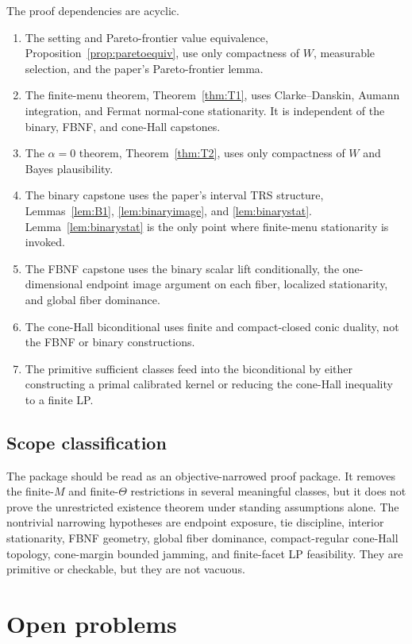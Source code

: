 \documentclass[11pt]{article}
\theoremstyle{definition}
\theoremstyle{remark}
\begin{document}
The proof dependencies are acyclic.
\begin{enumerate}[leftmargin=*]
  \item The setting and Pareto-frontier value equivalence, Proposition~\ref{prop:paretoequiv}, use only compactness of $W$, measurable selection, and the paper's Pareto-frontier lemma.
  \item The finite-menu theorem, Theorem~\ref{thm:T1}, uses Clarke--Danskin, Aumann integration, and Fermat normal-cone stationarity. It is independent of the binary, FBNF, and cone-Hall capstones.
  \item The $\alpha=0$ theorem, Theorem~\ref{thm:T2}, uses only compactness of $W$ and Bayes plausibility.
  \item The binary capstone uses the paper's interval TRS structure, Lemmas~\ref{lem:B1}, \ref{lem:binaryimage}, and \ref{lem:binarystat}. Lemma~\ref{lem:binarystat} is the only point where finite-menu stationarity is invoked.
  \item The FBNF capstone uses the binary scalar lift conditionally, the one-dimensional endpoint image argument on each fiber, localized stationarity, and global fiber dominance.
  \item The cone-Hall biconditional uses finite and compact-closed conic duality, not the FBNF or binary constructions.
  \item The primitive sufficient classes feed into the biconditional by either constructing a primal calibrated kernel or reducing the cone-Hall inequality to a finite LP.
\end{enumerate}

\subsection{Scope classification}

The package should be read as an objective-narrowed proof package. It removes the finite-$M$ and finite-$\Theta$ restrictions in several meaningful classes, but it does not prove the unrestricted existence theorem under standing assumptions alone. The nontrivial narrowing hypotheses are endpoint exposure, tie discipline, interior stationarity, FBNF geometry, global fiber dominance, compact-regular cone-Hall topology, cone-margin bounded jamming, and finite-facet LP feasibility. They are primitive or checkable, but they are not vacuous.

\section{Open problems}\label{sec:open}
\end{document}
